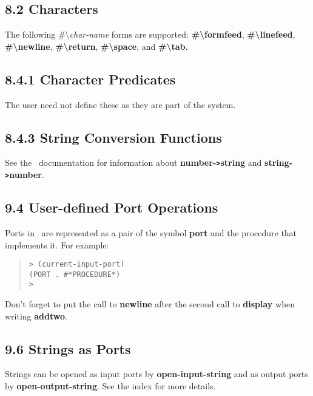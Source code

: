 \documentclass[10pt]{article}
\begin{document}
\subsection*{8.2 Characters}

The following \#\textbackslash{}\emph{char-name} forms are supported: \textbf{\#\textbackslash{}formfeed},
\textbf{\#\textbackslash{}linefeed}, \textbf{\#\textbackslash{}newline}, \textbf{\#\textbackslash{}return}, \textbf{\#\textbackslash{}space}, and \textbf{\#\textbackslash{}tab}.

\subsection*{8.4.1 Character Predicates}

The user need not define these as they are part of the system.

\subsection*{8.4.3 String Conversion Functions}

See the \StoC\ documentation for information about
\textbf{number-\texttt{>}string} and \textbf{string-\texttt{>}number}.

\subsection*{9.4 User-defined Port Operations}

Ports in \StoC\ are represented as a pair of the symbol
\textbf{port} and the procedure that implements it.  For example:

\begin{quote}
\begin{verbatim}
> (current-input-port)
(PORT . #*PROCEDURE*)
>
\end{verbatim}
\end{quote}

Don't forget to put the call to \textbf{newline} after the second
call to \textbf{display} when writing \textbf{addtwo}.

\subsection*{9.6 Strings as Ports}

Strings can be opened as input ports by \textbf{open-input-string} and
as output ports by \textbf{open-output-string}.  See the index for more
details.
\end{document}
